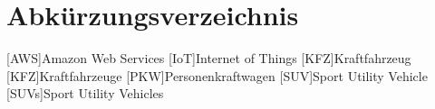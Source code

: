 \section*{Abkürzungsverzeichnis}
\begin{acronym}[KFZ]
    [AWS]{Amazon Web Services}
    [IoT]{Internet of Things}
    [KFZ]{Kraftfahrzeug}
    [KFZ]{Kraftfahrzeuge}
    [PKW]{Personenkraftwagen}
    [SUV]{Sport Utility Vehicle}
    [SUVs]{Sport Utility Vehicles}
\end{acronym}
